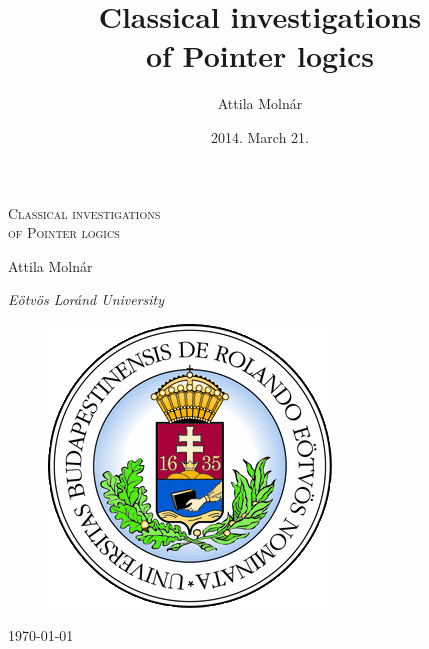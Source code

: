 \documentclass[xcolor=x11names]{beamer}
\author{Attila Moln\'ar}
\date{2014. March 21.}
\title{Classical investigations \\ of Pointer logics}
\institute{ELTE}
\begin{document}
\begin{frame}
\centering
\textsc{\Large Classical investigations \\ of Pointer logics}

\bigskip

{ \small Attila Moln\'ar

    \textit{E\"otv\"os Lor\'and University}}

 \begin{figure}
\includegraphics[scale=.3]{elte_cimer.png}
 \end{figure}

	\today
\end{frame}
\end{document}
